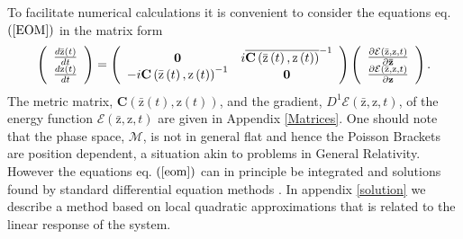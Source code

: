 \documentclass[aps,preprint]{revtex4}%
\begin{document}
To facilitate numerical calculations it is convenient to consider the
equations eq. $\left(  \ref{EOM}\right)  $ in the matrix form
\begin{equation}
\left(
\begin{array}
[c]{c}%
\frac{d\mathrm{\bar{z}}\left(  t\right)  }{dt}\\
\frac{d\mathrm{z}\left(  t\right)  }{dt}%
\end{array}
\right)  =\left(
\begin{array}
[c]{cc}%
\mathbf{0} & i\overline{\mathbf{C}\left(  \mathrm{\bar{z}}\left(  t\right)
,\mathrm{z}\left(  t\right)  \right)  }^{-1}\\
-i\mathbf{C}\left(  \mathrm{\bar{z}}\left(  t\right)  ,\mathrm{z}\left(
t\right)  \right)  ^{-1} & \mathbf{0}%
\end{array}
\right)  \left(
\begin{array}
[c]{c}%
\frac{\partial\mathcal{E}\left(  \mathrm{\bar{z}}\mathbf{,}\mathrm{z}%
,t\right)  }{\partial\mathbf{\bar{z}}}\\
\frac{\partial\mathcal{E}\left(  \mathrm{\bar{z}}\mathbf{,}\mathrm{z}%
,t\right)  }{\partial\mathbf{z}}%
\end{array}
\right)  . \label{eom}%
\end{equation}
The metric matrix, $\mathbf{C}\left(  \mathrm{\bar{z}}\left(  t\right)
,\mathrm{z}\left(  t\right)  \right)  $, and the gradient, $D^{1}%
\mathcal{E}\left(  \mathrm{\bar{z}}\mathbf{,}\mathrm{z},t\right)  $, of the
energy function $\mathcal{E}\left(  \mathrm{\bar{z}}\mathbf{,}\mathrm{z}%
,t\right)  $ are given in Appendix \ref{Matrices}. One should note that the
phase space, $\mathcal{M}$, is not in general flat and hence the Poisson
Brackets are position dependent, a situation akin to problems in General
Relativity. However the equations eq. $\left(  \ref{eom}\right)  $ can in
principle be integrated and solutions found by standard differential equation
methods \cite{DE}. In appendix \ref{solution} we describe a method based on
local quadratic approximations that is related to the linear response of the system.
\end{document}
